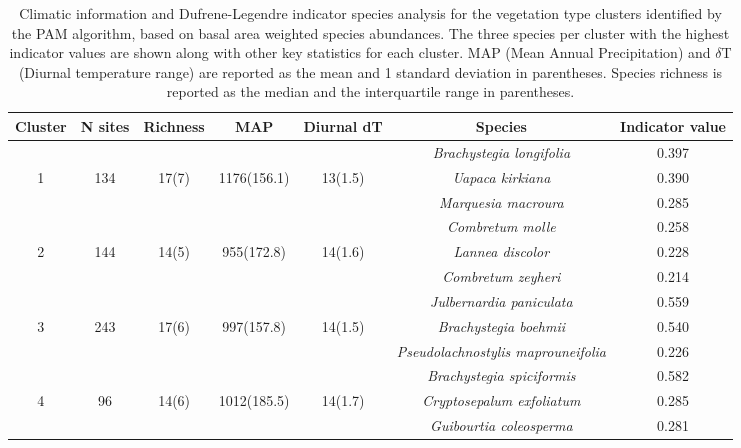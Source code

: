 \begin{table}[p]
\caption[Description of vegetation types]{Climatic information and Dufrene-Legendre indicator species analysis for the vegetation type clusters identified by the PAM algorithm, based on basal area weighted species abundances. The three species per cluster with the highest indicator values are shown along with other key statistics for each cluster. MAP (Mean Annual Precipitation) and $\delta$T (Diurnal temperature range) are reported as the mean and 1 standard deviation in parentheses. Species richness is reported as the median and the interquartile range in parentheses.} 
\label{phen:clust_summ}
\begin{tabular}{cSccccS}
  \toprule
{Cluster} & {N sites} & {Richness} & {MAP} & {Diurnal dT} & {Species} & {Indicator value} \\
  \midrule
 &  &  &  &  & \textit{Brachystegia longifolia} & 0.397 \\ 
  1 & 134 & 17(7) & 1176(156.1) & 13(1.5) & \textit{Uapaca kirkiana} & 0.390 \\ 
   &  &  &  &  & \textit{Marquesia macroura} & 0.285 \\ 
  \midrule
 &  &  &  &  & \textit{Combretum molle} & 0.258 \\ 
  2 & 144 & 14(5) & 955(172.8) & 14(1.6) & \textit{Lannea discolor} & 0.228 \\ 
   &  &  &  &  & \textit{Combretum zeyheri} & 0.214 \\ 
  \midrule
 &  &  &  &  & \textit{Julbernardia paniculata} & 0.559 \\ 
  3 & 243 & 17(6) & 997(157.8) & 14(1.5) & \textit{Brachystegia boehmii} & 0.540 \\ 
   &  &  &  &  & \textit{Pseudolachnostylis maprouneifolia} & 0.226 \\ 
  \midrule
 &  &  &  &  & \textit{Brachystegia spiciformis} & 0.582 \\ 
  4 & 96 & 14(6) & 1012(185.5) & 14(1.7) & \textit{Cryptosepalum exfoliatum} & 0.285 \\ 
   &  &  &  &  & \textit{Guibourtia coleosperma} & 0.281 \\ 
   \bottomrule
\end{tabular}
\end{table}

